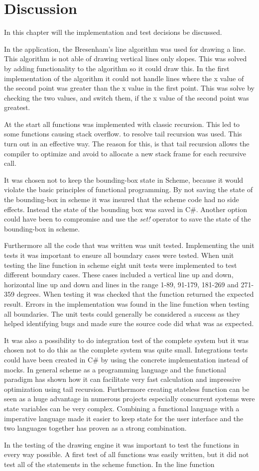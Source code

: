 \chapter{Discussion}
\label{chp:disc}

In this chapter will the implementation and test decisions be discussed. 

In the application, the Bresenham’s line algorithm was used for drawing a line. This algorithm is not able of drawing vertical lines only slopes. This was solved by adding functionality to the algorithm so it could draw this. In the first implementation of the algorithm it could not handle lines where the x value of the second point was greater than the x value in the first point. This was solve by checking the two values, and switch them, if the x value of the second point was greatest.

At the start all functions was implemented with classic recursion. This led to some functions causing stack overflow. to resolve tail recursion was used. This turn out in an effective way. The reason for this, is that tail recursion allows the compiler to optimize and avoid to allocate a new stack frame for each recursive call. 

It was chosen not to keep the bounding-box state in Scheme, because it would violate the basic principles of functional programming. By not saving the state of the bounding-box in scheme it was insured that the scheme code had no side effects. Instead the state of the bounding box was saved in C\#. Another option could have been to compromise and use the \emph{set!} operator to save the state of the bounding-box in scheme.

Furthermore all the code that was written was unit tested. Implementing the unit tests it was important to ensure all boundary cases were tested. When unit testing the line function in scheme eight unit tests were implemented to test different boundary cases. These cases included a vertical line up and down, horizontal line up and down and lines in the range 1-89, 91-179, 181-269 and 271-359 degrees. When testing it was checked that the function returned the expected result. Errors in the implementation was found in the line function when testing all boundaries. The unit tests could generally be considered a success as they helped identifying bugs and made sure the source code did what was as expected.

It was also a possibility to do integration test of the complete system but it was chosen not to do this as the complete system was quite small. Integrations tests could have been created in C\# by using the concrete implementation instead of mocks.
In general scheme as a programming language and the functional paradigm has shown how it can facilitate very fast calculation and impressive optimization using tail recursion. Furthermore creating stateless function can be seen as a huge advantage in numerous projects especially concurrent systems were state variables can be very complex. Combining a functional language with a imperative language made it easier to keep state for the user interface and the two languages together has proven as a strong combination.

In the testing of the drawing engine it was important to test the functions in every way possible. A first test of all functions was easily written, but it did not test all of the statements in the scheme function. In the line function